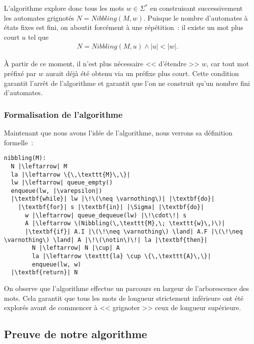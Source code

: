 \vphantom{}

L’algorithme explore donc tous les mots \(w \in \Sigma^*\) en construisant
successivement les automates grignotés \(N = Nibbling(M, w)\). Puisque le
nombre d’automates à états fixes est fini, on aboutit forcément à une
répétition~: il existe un mot plus court \(u\) tel que
\begin{align*}
N = Nibbling(M, u) \land \lvert u \rvert < \lvert w \rvert.
\end{align*}

À partir de ce moment, il n’est plus nécessaire << d’étendre >> \(w\), car
tout mot préfixé par \(w\) aurait déjà été obtenu via un préfixe plus court.
Cette condition garantit l’arrêt de l’algorithme et garantit que l’on ne
construit qu’un nombre fini d’automates.

\subsubsection{Formalisation de l'algorithme}

Maintenant que nous avons l'idée de l'algorithme, nous verrons sa
définition formelle~:
\begin{verbatim}
nibbling(M):
  N |\leftarrow| M
  la |\leftarrow \{\,\texttt{M}\,\}|
  lw |\leftarrow| queue_empty()
  enqueue(lw, |\varepsilon|)
  |\textbf{while}| lw |\!\(\neq \varnothing\)| |\textbf{do}|
    |\textbf{for}| s |\textbf{in}| |\Sigma| |\textbf{do}|
      w |\leftarrow| queue_dequeue(lw) |\!\cdot\!| s
      A |\leftarrow \(Nibbling(\,\texttt{M},\; \texttt{w}\,)\)|
      |\textbf{if}| A.I |\(\!\neq \varnothing\) \land| A.F |\(\!\neq \varnothing\) \land| A |\!\(\notin\)\!| la |\textbf{then}|
        N |\leftarrow| N |\cup| A
        la |\leftarrow \texttt{la} \cup \{\,\texttt{A}\,\}|
        enqueue(lw, w)
  |\textbf{return}| N
\end{verbatim}

\begin{remark}
  On observe que l’algorithme effectue un parcours en largeur de
  l’arborescence des mots. Cela garantit que tous les mots de longueur
  strictement inférieure ont été explorés avant de commencer à << grignoter >>
  ceux de longueur supérieure.
\end{remark}

\subsection{Preuve de notre algorithme}

